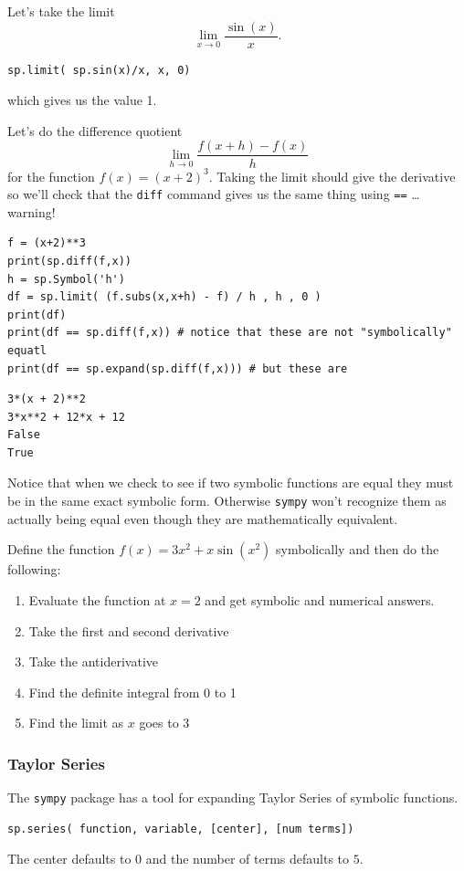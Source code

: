 \begin{example}
    Let's take the limit
$$\lim_{x \to 0} \frac{\sin(x)}{x}.$$

\bcode
\begin{lstlisting}
sp.limit( sp.sin(x)/x, x, 0)
\end{lstlisting}
which gives us the value 1.
\end{example}

\begin{example}
    Let's do the difference quotient
$$\lim_{h \to 0} \frac{ f(x+h) - f(x)}{h}$$
for the function $f(x) = (x+2)^3$.  Taking the limit should give the derivative so we'll
check that the \texttt{diff} command gives us the same thing using \texttt{==} \ldots warning!

\bcode
\begin{lstlisting}
f = (x+2)**3
print(sp.diff(f,x))
h = sp.Symbol('h')
df = sp.limit( (f.subs(x,x+h) - f) / h , h , 0 )
print(df)
print(df == sp.diff(f,x)) # notice that these are not "symbolically" equatl
print(df == sp.expand(sp.diff(f,x))) # but these are
\end{lstlisting}
\boutput
\begin{lstlisting}
3*(x + 2)**2
3*x**2 + 12*x + 12
False
True
\end{lstlisting}
Notice that when we check to see if two symbolic functions are equal they must be in the
same exact symbolic form.  Otherwise \texttt{sympy} won't recognize them as actually being
equal even though they are mathematically equivalent.
\end{example}

\begin{problem}
    Define the function $f(x) = 3x^2 + x\sin(x^2)$ symbolically and then do the following:

    \begin{enumerate}
        \item Evaluate the function at $x=2$ and get symbolic and numerical answers.
        \item Take the first and second derivative
        \item Take the antiderivative
        \item Find the definite integral from 0 to 1
        \item Find the limit as $x$ goes to 3
    \end{enumerate}
\end{problem}

\subsubsection{Taylor Series}
The \texttt{sympy} package has a tool for expanding Taylor Series of symbolic functions.  
\begin{lstlisting}
sp.series( function, variable, [center], [num terms])
\end{lstlisting}
The center defaults to $0$ and the number of terms defaults to $5$.  

